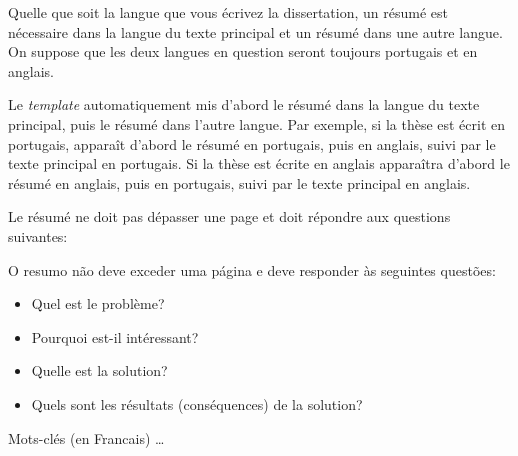 Quelle que soit la langue que vous écrivez la dissertation, un résumé est nécessaire dans la langue du texte principal et un résumé dans une autre langue. On suppose que les deux langues en question seront toujours portugais et en anglais.

Le \emph{template} automatiquement mis d'abord le résumé dans la langue du texte principal, puis le résumé dans l'autre langue. Par exemple, si la thèse est écrit en portugais, apparaît d'abord le résumé en portugais, puis en anglais, suivi par le texte principal en portugais. Si la thèse est écrite en anglais apparaîtra d'abord le résumé en anglais, puis en portugais, suivi par le texte principal en anglais.

Le résumé ne doit pas dépasser une page et doit répondre aux questions suivantes:

O resumo não deve exceder uma página e deve responder às seguintes questões:
\begin{itemize}
	\item Quel est le problème?
	\item Pourquoi est-il intéressant?
	\item Quelle est la solution?
	\item Quels sont les résultats (conséquences) de la solution?
\end{itemize}

\begin{keywords}
Mots-clés (en Francais) \ldots
\end{keywords}
